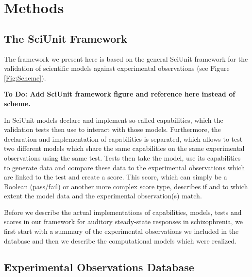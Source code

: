 \documentclass[a4paper,10pt]{article}
\begin{document}
\section{Methods}

\subsection{The SciUnit Framework}
The framework we present here is based on the general SciUnit framework for the validation of scientific models against 
experimental observations \cite{Omar2014} (see Figure \ref{Fig:Scheme}).

\textbf{To Do: Add SciUnit framework figure and reference here instead of scheme.}

In SciUnit models declare and implement so-called capabilities, which the validation tests then use to 
interact with those models. Furthermore, the declaration
and implementation of capabilities is separated, which allows to test two different models which share the 
same capabilities on the same experimental observations using
the same test. Tests then take the model, use its capabilities to generate data and compare these data to the 
experimental observations which are linked to the test
and create a score. This score, which can simply be a Boolean (pass/fail) or another more complex score type, 
describes if and to which extent the model data and the experimental observation(s) match.

Before we describe the actual implementations of capabilities, models, tests and scores in our framework for 
auditory steady-state responses in schizophrenia,
we first start with a summary of the experimental observations we included in the database and 
then we describe the computational models which were realized.

\subsection{Experimental Observations Database}
\end{document}
